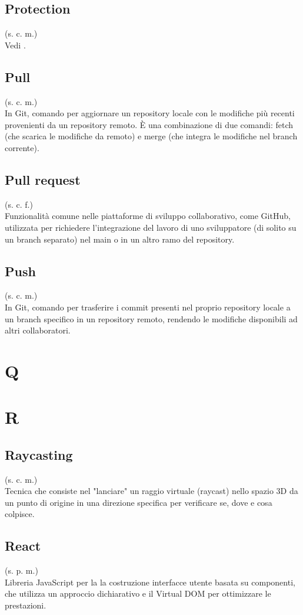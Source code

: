 \subsection{Protection}
(s. c. m.)\\
Vedi .
\subsection{Pull}
(s. c. m.)\\
In Git, comando per aggiornare un repository locale con le modifiche più recenti provenienti
da un repository remoto. È una combinazione di due comandi: fetch (che scarica le modifiche
da remoto) e merge (che integra le modifiche nel branch corrente).
\subsection{Pull request}
(s. c. f.)\\
Funzionalità comune nelle piattaforme di sviluppo collaborativo, come GitHub, utilizzata per
richiedere l'integrazione del lavoro di uno sviluppatore (di solito su un branch separato)
nel main o in un altro ramo del repository.
\subsection{Push}
(s. c. m.)\\
In Git, comando per trasferire i commit presenti nel proprio repository locale a un
branch specifico in un repository remoto, rendendo le modifiche disponibili
ad altri collaboratori.

\pagebreak
\section{Q}
\pagebreak
\section{R}
\subsection{Raycasting}
(s. c. m.)\\
Tecnica che consiste nel "lanciare" un raggio virtuale (raycast) nello spazio 3D da un punto 
di origine in una direzione specifica per verificare se, dove e cosa colpisce.
\subsection{React}
(s. p. m.)\\
Libreria JavaScript per la la costruzione interfacce utente basata su componenti, che utilizza un
approccio dichiarativo e il Virtual DOM per ottimizzare le prestazioni.
